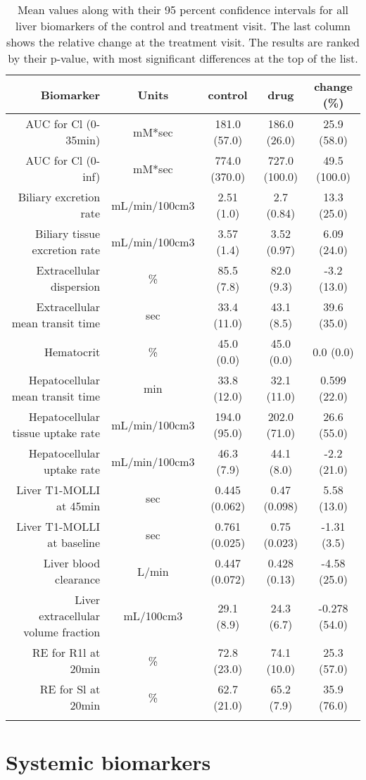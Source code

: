\documentclass{epflreport}%
\begin{document}
\begin{longtable}{rcccc}%
\hline%
Biomarker&Units&control&drug&change (\%)\\%
\hline%
AUC for Cl (0{-}35min)&mM*sec&181.0 (57.0) &186.0 (26.0) &25.9 (58.0) \\%
AUC for Cl (0{-}inf)&mM*sec&774.0 (370.0) &727.0 (100.0) &49.5 (100.0) \\%
Biliary excretion rate&mL/min/100cm3&2.51 (1.0) &2.7 (0.84) &13.3 (25.0) \\%
Biliary tissue excretion rate&mL/min/100cm3&3.57 (1.4) &3.52 (0.97) &6.09 (24.0) \\%
Extracellular dispersion&\%&85.5 (7.8) &82.0 (9.3) &{-}3.2 (13.0) \\%
Extracellular mean transit time&sec&33.4 (11.0) &43.1 (8.5) &39.6 (35.0) \\%
Hematocrit&\%&45.0 (0.0) &45.0 (0.0) &0.0 (0.0) \\%
Hepatocellular mean transit time&min&33.8 (12.0) &32.1 (11.0) &0.599 (22.0) \\%
Hepatocellular tissue uptake rate&mL/min/100cm3&194.0 (95.0) &202.0 (71.0) &26.6 (55.0) \\%
Hepatocellular uptake rate&mL/min/100cm3&46.3 (7.9) &44.1 (8.0) &{-}2.2 (21.0) \\%
Liver T1{-}MOLLI at 45min&sec&0.445 (0.062) &0.47 (0.098) &5.58 (13.0) \\%
Liver T1{-}MOLLI at baseline&sec&0.761 (0.025) &0.75 (0.023) &{-}1.31 (3.5) \\%
Liver blood clearance&L/min&0.447 (0.072) &0.428 (0.13) &{-}4.58 (25.0) \\%
Liver extracellular volume fraction&mL/100cm3&29.1 (8.9) &24.3 (6.7) &{-}0.278 (54.0) \\%
RE for R1l at 20min&\%&72.8 (23.0) &74.1 (10.0) &25.3 (57.0) \\%
RE for Sl at 20min&\%&62.7 (21.0) &65.2 (7.9) &35.9 (76.0) \\%
\hline%
\caption{Mean values along with their 95 percent confidence intervals for all liver biomarkers of the control and treatment visit. The last column shows the relative change at the treatment visit. The results are ranked by their p-value, with most significant differences at the top of the list.} \\%
\end{longtable}%
\clearpage%
\section{Systemic biomarkers}%
\label{sec:Systemicbiomarkers}%
\end{document}
